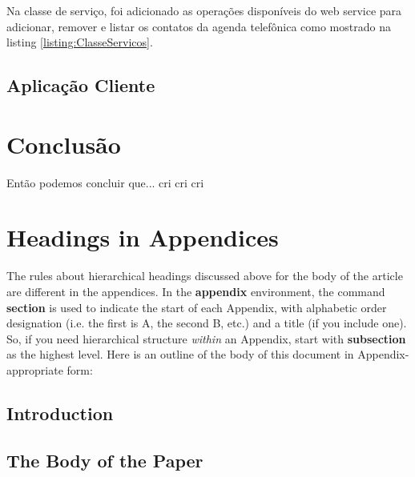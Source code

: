 \documentclass{acm_proc_article-sp}
\begin{document}
	
	
	Na classe de serviço, foi adicionado as operações disponíveis do web service para adicionar, remover e listar os contatos da agenda telefônica como mostrado na listing \ref{listing:ClasseServicos}.
	
	
	
	\subsection{Aplicação Cliente}

\section{Conclusão}
	Então podemos concluir que... cri cri cri



%

%
%
\appendix
\section{Headings in Appendices}
The rules about hierarchical headings discussed above for
the body of the article are different in the appendices.
In the \textbf{appendix} environment, the command
\textbf{section} is used to
indicate the start of each Appendix, with alphabetic order
designation (i.e. the first is A, the second B, etc.) and
a title (if you include one).  So, if you need
hierarchical structure
\textit{within} an Appendix, start with \textbf{subsection} as the
highest level. Here is an outline of the body of this
document in Appendix-appropriate form:
\subsection{Introduction}
\subsection{The Body of the Paper}
\end{document}
